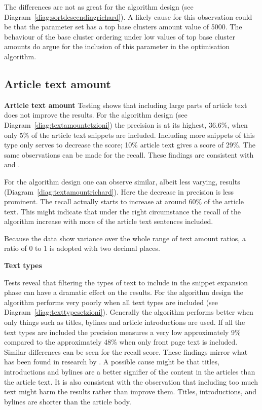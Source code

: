 The differences are not as great for the \citeauthor{Moe2013compact} algorithm design (see Diagram~\ref{diag:sortdescendingrichard}). A likely cause for this observation could be that the \citeauthor{Moe2013compact} parameter set has a top base clusters amount value of 5000. The behaviour of the base cluster ordering under low values of top base cluster amounts do argue for the inclusion of this parameter in the optimisation algorithm.

\subsection{Article text amount}

\textbf{Article text amount}
Testing shows that including large parts of article text does not improve the results. For the \citeauthor{Oren1998} algorithm design (see Diagram~\ref{diag:textamountetzioni}) the precision is at its highest, 36.6\%, when only 5\% of the article text snippets are included. Including more snippets of this type only serves to decrease the score; 10\% article text gives a score of 29\%. The same observations can be made for the recall. These findings are consistent with \cite{Oren1998} and \cite{Moe2013compact}.

For the \citeauthor{Moe2013compact} algorithm design one can observe similar, albeit less varying, results (Diagram~\ref{diag:textamountrichard}). Here the decrease in precision is less prominent. The recall actually starts to increase at around 60\% of the article text. This might indicate that under the right circumstance the recall of the algorithm increase with more of the article text sentences included.

Because the data show variance over the whole range of text amount ratios, a ratio of 0 to 1 is adopted with two decimal places.

\textbf{Text types}

Tests reveal that filtering the types of text to include in the snippet expansion phase can have a dramatic effect on the results. For the \citeauthor{Oren1998} algorithm design the \CTC algorithm performs very poorly when all text types are included (see Diagram~\ref{diag:texttypesetzioni}). Generally the algorithm performs better when only things such as titles, bylines and article introductions are used. If all the text types are included the precision measures a very low approximately  9\% compared to the approximately  48\% when only front page text is included. Similar differences can be seen for the recall score. These findings mirror what has been found in research by \cite{Oren1998}. A possible cause might be that titles, introductions and bylines are a better signifier of the content in the articles than the article text. It is also consistent with the observation that including too much text might harm the results rather than improve them. Titles, introductions, and bylines are shorter than the article body.


